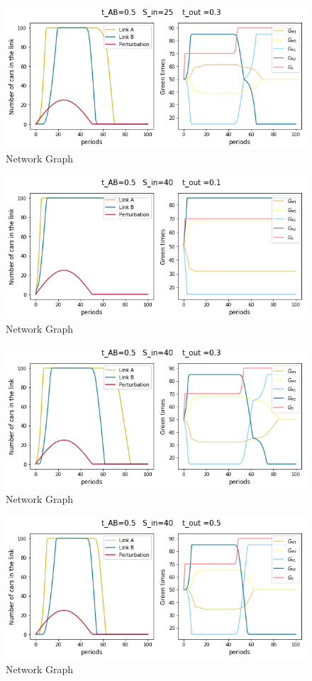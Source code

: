 \documentclass[11pt]{article}
\begin{document}
\begin{figure}
    \caption{Network Graph}
      \centering
	\includegraphics[width=15cm]{sim2}
\end{figure}

\begin{figure}
    \caption{Network Graph}
      \centering
	\includegraphics[width=15cm]{sim3}
\end{figure}

\begin{figure}
    \caption{Network Graph}
      \centering
	\includegraphics[width=15cm]{sim4}
\end{figure}

\begin{figure}
    \caption{Network Graph}
      \centering
	\includegraphics[width=15cm]{sim5}
\end{figure}
\end{document}
